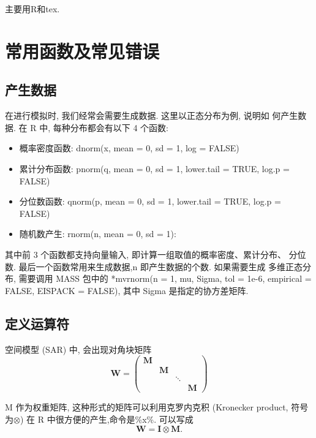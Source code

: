 \documentclass[]{ctexbook}
\providecommand{\tightlist}{%
  \setlength{\itemsep}{0pt}\setlength{\parskip}{0pt}}
\begin{document}
主要用R和tex.

\mainmatter

\hypertarget{section-2}{%
\chapter{常用函数及常见错误}\label{section-2}}

\hypertarget{section-3}{%
\section{产生数据}\label{section-3}}

在进行模拟时, 我们经常会需要生成数据. 这里以正态分布为例, 说明如 何产生数据. 在 R 中, 每种分布都会有以下 4 个函数:

\begin{itemize}
\tightlist
\item
  概率密度函数: dnorm(x, mean = 0, sd = 1, log = FALSE)
\item
  累计分布函数: pnorm(q, mean = 0, sd = 1, lower.tail = TRUE, log.p = FALSE)
\item
  分位数函数: qnorm(p, mean = 0, sd = 1, lower.tail = TRUE, log.p = FALSE)
\item
  随机数产生: rnorm(n, mean = 0, sd = 1):
\end{itemize}

其中前 3 个函数都支持向量输入, 即计算一组取值的概率密度、累计分布、 分位数. 最后一个函数常用来生成数据,n 即产生数据的个数. 如果需要生成 多维正态分布, 需要调用 MASS 包中的
*mvrnorm(n = 1, mu, Sigma, tol = 1e-6, empirical = FALSE, EISPACK = FALSE),
其中 Sigma 是指定的协方差矩阵.

\hypertarget{section-4}{%
\section{定义运算符}\label{section-4}}

空间模型 (SAR) 中, 会出现对角块矩阵 \[ \mathbf{W}=\left(\begin{array}{cccc}{\mathbf{M}} & {} & {} & {} \\ {} & {\mathbf{M}} & {} & {} \\ {} & {} & {\ddots} & {} \\ {} & {} & {} & {\mathbf{M}}\end{array}\right) \]

M 作为权重矩阵, 这种形式的矩阵可以利用克罗内克积 (Kronecker product, 符号为\(\otimes\)) 在 R 中很方便的产生,命令是\%x\%.
可以写成\[\mathbf{W} = \mathbf{I} \otimes \mathbf{M}.\]
\end{document}

